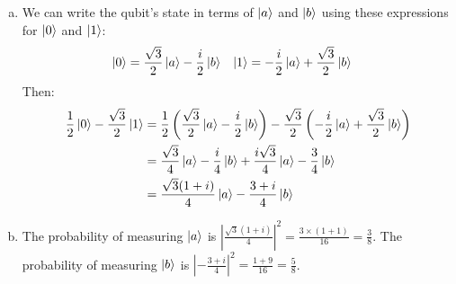 \documentclass[12pt]{extarticle}
\begin{document}
\begin{enumerate}[(a)]
\item We can write the qubit's state in terms of $\ket{a}$ and $\ket{b}$ using these expressions for $\ket{0}$ and $\ket{1}$:
\begin{align*}
\ket{0} & = \frac{\sqrt{3}}{2}\ket{a} - \frac{i}{2}\ket{b} & \ket{1} & = -\frac{i}{2}\ket{a} + \frac{\sqrt{3}}{2}\ket{b}
\end{align*}
Then:
\begin{align*}
\frac{1}{2}\ket{0} - \frac{\sqrt{3}}{2}\ket{1} & = \frac{1}{2}\left(\frac{\sqrt{3}}{2}\ket{a} - \frac{i}{2}\ket{b}\right) - \frac{\sqrt{3}}{2}\left(-\frac{i}{2}\ket{a} + \frac{\sqrt{3}}{2}\ket{b}\right) \\
& = \frac{\sqrt{3}}{4}\ket{a} - \frac{i}{4}\ket{b} + \frac{i\sqrt{3}}{4}\ket{a} - \frac{3}{4}\ket{b} \\
& = \frac{\sqrt{3}(1+i)}{4}\ket{a} - \frac{3+i}{4}\ket{b} \\
\end{align*}
\item The probability of measuring $\ket{a}$ is $\left|\frac{\sqrt{3}(1+i)}{4}\right|^2 = \frac{3\times (1+1)}{16} = \frac{3}{8}$.
The probability of measuring $\ket{b}$ is $\left|-\frac{3+i}{4}\right|^2 = \frac{1+9}{16} = \frac{5}{8}$.
\end{enumerate}

\printbibliography
\end{document}
